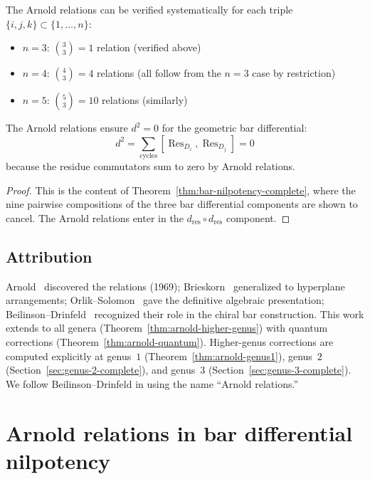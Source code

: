 \begin{remark}\label{rem:nine-term-detailed-arnold}
The Arnold relations can be verified systematically for each triple $\{i,j,k\} \subset \{1,\ldots,n\}$:
\begin{itemize}
\item $n=3$: $\binom{3}{3} = 1$ relation (verified above)
\item $n=4$: $\binom{4}{3} = 4$ relations (all follow from the $n=3$ case by restriction)
\item $n=5$: $\binom{5}{3} = 10$ relations (similarly)
\end{itemize}
\end{remark}

\begin{corollary}\label{cor:bar-d-squared-zero-arnold}
The Arnold relations ensure $d^2 = 0$ for the geometric bar differential:
\[d^2 = \sum_{\text{cycles}} [\operatorname{Res}_{D_i}, \operatorname{Res}_{D_j}] = 0\]
because the residue commutators sum to zero by Arnold relations.
\begin{proof}
This is the content of Theorem~\ref{thm:bar-nilpotency-complete}, where the nine pairwise compositions of the three bar differential components are shown to cancel.  The Arnold relations enter in the $d_{\mathrm{res}} \circ d_{\mathrm{res}}$ component.
\end{proof}
\end{corollary}

\subsection{Attribution}

Arnold~\cite{Arnold69} discovered the relations (1969); Brieskorn~\cite{Brieskorn73} generalized to hyperplane arrangements; Orlik--Solomon~\cite{OS80} gave the definitive algebraic presentation; Beilinson--Drinfeld~\cite{BD04} recognized their role in the chiral bar construction.  This work extends to all genera (Theorem~\ref{thm:arnold-higher-genus}) with quantum corrections (Theorem~\ref{thm:arnold-quantum}).  Higher-genus corrections are computed explicitly at genus~$1$ (Theorem~\ref{thm:arnold-genus1}), genus~$2$ (Section~\ref{sec:genus-2-complete}), and genus~$3$ (Section~\ref{sec:genus-3-complete}).  We follow Beilinson--Drinfeld in using the name ``Arnold relations.''

\section{Arnold relations in bar differential nilpotency}
\label{sec:arnold-in-bar-nilpotency}

